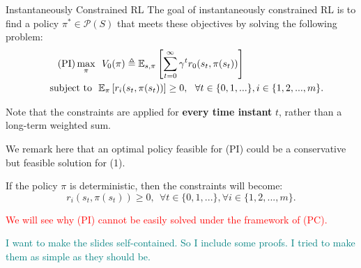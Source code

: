 \documentclass[aspectratio=43, 10pt]{beamer}
\begin{document}
    \begin{frame}[t]{Instantaneously Constrained RL}
        The goal of instantaneously constrained RL is to find a policy $\pi^* \in \mathcal{P}(S)$ that meets these objectives by solving the following problem: 
            \begin{align}
                \tag{PI}
                \max_{\pi} &~~ V_0(\pi) \triangleq \mathbb{E}_{s,\pi} \left[ \sum_{t=0}^{\infty} \gamma^t r_0(s_t, \pi(s_t)) \right]  \\
                \text{subject to } & ~\mathbb{E}_{\pi} \left[  r_i(s_t, \pi(s_t))  \right] \geq 0,~~  \forall t \in \{0,1,...\}, i \in \{1,2,...,m\}. \notag
            \end{align}

        Note that the constraints are applied for \textbf{every time instant} $t$, rather than a long-term weighted sum. 

        We remark here that an optimal policy feasible for (PI) could be a conservative but feasible solution for (1). 
        
        If the policy $\pi$ is deterministic, then the constraints will become: 
        \begin{equation}
            r_i(s_t, \pi(s_t)) \geq 0, ~~\forall t \in \{0,1,...\}, \forall i \in \{1,2,...,m\}. 
        \end{equation}

        \textcolor{red}{We will see why (PI) cannot be easily solved under the framework of (PC).}

        \textcolor{teal}{I want to make the slides self-contained. So I include some proofs. I tried to make them as simple as they should be.}

    \end{frame}    
\end{document}
